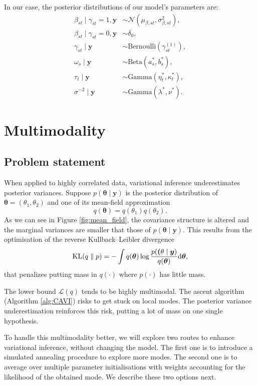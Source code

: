 \documentclass[a4paper, 11pt]{report}
\numberwithin{equation}{chapter}
\DeclareMathOperator*{\KL}{{\rm KL}}
\begin{document}
In our case, the posterior distributions of our model's parameters are:
\begin{align*}
\beta_{st} \mid \gamma_{st} = 1, \boldsymbol{y} &\sim \mathcal{N}\left(\mu_{\beta, st},\sigma^2_{\beta, st}\right),\\
\beta_{st} \mid \gamma_{st} = 0, \boldsymbol{y} &\sim \delta_0,\\
\gamma_{st} \mid \boldsymbol{y} &\sim \text{Bernoulli}(\gamma_{st}^{(1)}),\\
\omega_s\mid\boldsymbol{y} &\sim \text{Beta}(a_s^*,b_s^*),\\
\tau_t\mid \boldsymbol{y} &\sim \text{Gamma}(\eta^*_t, \kappa^*_t),\\
\sigma^{-2} \mid \boldsymbol{y} &\sim \text{Gamma}(\lambda^*, \nu^*).
\end{align*}

\newpage
\chapter{Multimodality}
\section{Problem statement} \label{sec:pro_stat}
When applied to highly correlated data, variational inference underestimates posterior variances. Suppose $p(\boldsymbol{\theta} \mid \boldsymbol{y})$ is the posterior distribution of $\boldsymbol{\theta} = (\theta_1,\theta_2)$ and one of its mean-field approximation $$
q(\boldsymbol{\theta}) = q(\theta_1)q(\theta_2).
$$
As we can see in Figure \ref{fig:mean_field}, the covariance structure is altered and the marginal variances are smaller that those of $p(\boldsymbol{\theta} \mid \boldsymbol{y})$. This results from the optimisation of the reverse Kullback--Leibler divergence
$$
\KL (q\parallel p) = - \int q(\boldsymbol{\theta})\log\frac{p(\boldsymbol(\theta\mid\boldsymbol{y})}{q(\boldsymbol{\theta})}\mathrm{d}\boldsymbol{\theta},
$$
that penalizes putting mass in $q(\cdot)$ where $p(\cdot)$ has little mass.

The lower bound $\mathcal{L}(q)$ tends to be highly multimodal. The ascent algorithm (Algorithm \ref{alg:CAVI}) risks to get stuck on local modes. The posterior variance underestimation reinforces this risk, putting a lot of mass on one single hypothesis.

To handle this multimodality better, we will explore two routes to enhance variational inference, without changing the model. The first one is to introduce a simulated annealing procedure to explore more modes. The second one is to average over multiple parameter initialisations with weights accounting for the likelihood of the obtained mode. We describe these two options next.
\end{document}
